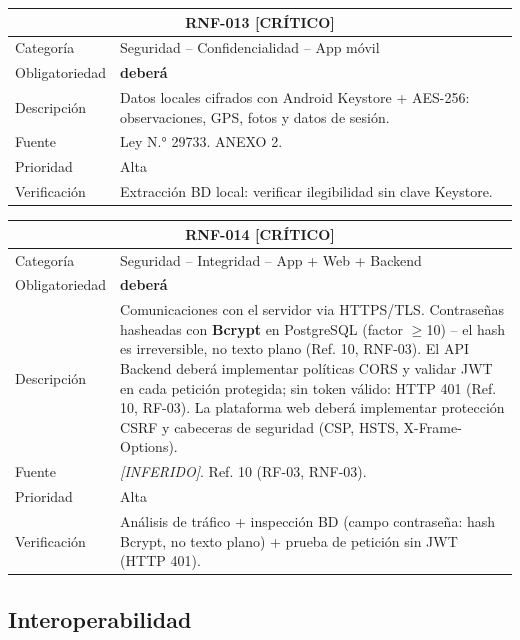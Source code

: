 \documentclass[12pt, a4paper]{article}
\newcommand{\criticomark}{\textcolor{criticolor}{\textbf{[CR\'ITICO]}}}
\newcommand{\inferido}{\textcolor{medio}{\textit{[INFERIDO]}}}
\begin{document}
\begin{longtable}{|p{3cm}|p{11.5cm}|}
\hline
\multicolumn{2}{|c|}{\textbf{RNF-013} \criticomark} \\
\hline
Categor\'ia & Seguridad -- Confidencialidad -- App m\'ovil \\
\hline
Obligatoriedad & \textbf{deber\'a} \\
\hline
Descripci\'on & Datos locales cifrados con Android Keystore + AES-256: observaciones, GPS, fotos y datos de sesi\'on. \\
\hline
Fuente & Ley N.° 29733. ANEXO 2. \\
\hline
Prioridad & Alta \\
\hline
Verificaci\'on & Extracci\'on BD local: verificar ilegibilidad sin clave Keystore. \\
\hline
\end{longtable}

\begin{longtable}{|p{3cm}|p{11.5cm}|}
\hline
\multicolumn{2}{|c|}{\textbf{RNF-014} \criticomark} \\
\hline
Categor\'ia & Seguridad -- Integridad -- App + Web + Backend \\
\hline
Obligatoriedad & \textbf{deber\'a} \\
\hline
Descripci\'on & Comunicaciones con el servidor via HTTPS/TLS. Contrase\~nas hasheadas con \textbf{Bcrypt} en PostgreSQL (factor $\geq$10) -- el hash es irreversible, no texto plano (Ref. 10, RNF-03). El API Backend deber\'a implementar pol\'iticas CORS y validar JWT en cada petici\'on protegida; sin token v\'alido: HTTP 401 (Ref. 10, RF-03). La plataforma web deber\'a implementar protecci\'on CSRF y cabeceras de seguridad (CSP, HSTS, X-Frame-Options). \\
\hline
Fuente & \inferido{}. Ref. 10 (RF-03, RNF-03). \\
\hline
Prioridad & Alta \\
\hline
Verificaci\'on & An\'alisis de tr\'afico + inspecci\'on BD (campo contrase\~na: hash Bcrypt, no texto plano) + prueba de petici\'on sin JWT (HTTP 401). \\
\hline
\end{longtable}

\subsection{Interoperabilidad}
\end{document}
